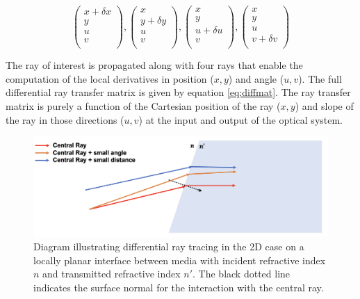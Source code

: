 \begin{center}
    
\begin{equation}
    \begin{pmatrix}
    x + \delta x \\
    y \\
    u \\
    v \\
    \end{pmatrix}
    ,
    \begin{pmatrix}
    x \\
    y + \delta y \\
    u \\
    v \\
    \end{pmatrix}
    ,
    \begin{pmatrix}
    x \\
    y \\
    u + \delta u\\
    v \\
    \end{pmatrix}
    ,
    \begin{pmatrix}
    x \\
    y \\
    u \\
    v + \delta v\\
    \end{pmatrix}
\end{equation}

\end{center}
The ray of interest is propagated along with four rays that enable the computation of the local derivatives in position ($x,y$) and angle ($u,v$). The full differential ray transfer matrix is given by equation \ref{eq:diffmat}. The ray transfer matrix is purely a function of the Cartesian position of the ray ($x,y$) and  slope of the ray in those directions ($u,v$) at the input and output of the optical system.

\begin{figure}[H]
    \centering
    \includegraphics[width=\textwidth]{differential_diagram.png}
    \caption{Diagram illustrating differential ray tracing in the 2D case on a locally planar interface between media with incident refractive index $n$ and transmitted refractive index $n'$. The black dotted line indicates the surface normal for the interaction with the central ray.}
    \label{fig:my_label}
\end{figure}


